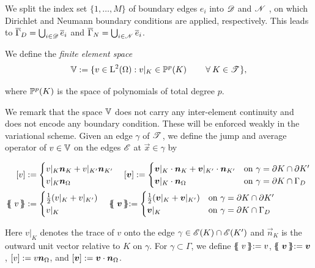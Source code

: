 \documentclass[a4paper,11pt]{article}
\begin{document}
{We split the index set $\{1,\dots,M\}$ of boundary edges $e_{i}$ into $\mathscr D$ and $\mathscr N$ , on which Dirichlet and Neumann boundary conditions are applied, respectively. This leads to $\overline{\Gamma}_{D} = \bigcup_{i\in \mathscr D}\overline{e}_{i}$ and $\overline{\Gamma}_{N} = \bigcup_{i\in \mathscr N}\overline{e}_{i}$. 

We define the \emph{finite element space}
\begin{gather}
  \label{eqn:def:finite-element-space}
  \mathbb V :=   \{ v\in \operatorname L^{2}(\Omega): v|_K \in \mathbb P^{p} (K) \quad \quad\:\forall\: K \in \mathscr T^{} \},
\end{gather}

where $\mathbb P^{p} (K)$ is the space of polynomials of total degree $p$.

We remark that the space $\mathbb V$ does not carry any inter-element continuity and does not encode any boundary condition. These will be enforced weakly in the variational scheme. 
Given an edge $\gamma$ of $\mathscr T^{}$, we define the jump and average operator of $v \in \mathbb V$ on the edges $\mathscr E$ at $\vec{x} \in \gamma$  by

\begin{align}
    \jump{v} &:=
    \begin{cases}
        v |_{K} \vec{n}_{K} + v |_{K'} \vec{n}_{K'} \\
        v |_{K} \vec{n}_{\Omega} 
    \end{cases} 
    \jump{\vec{v}} :=
    \begin{cases}
        \vec{v} |_{K} \cdot \vec{n}_{K} + \vec{v} |_{K'} \cdot \vec{n}_{K'} &  \text{on } \gamma = \partial K \cap  \partial K'\\
        \vec{v} |_{K} \cdot \vec{n}_{\Omega} &  \text{on } \gamma = \partial K \cap  \Gamma_{D} 
    \end{cases}
    \\
    \avg{v} &:=
    \begin{cases}
        \frac{1}{2} ( v |_{K} + v |_{K'}) \\
        v |_{K}  
    \end{cases} 
    \avg{\vec{v}} :=
    \begin{cases}
        \frac{1}{2}(\vec{v} |_{K} + \vec{v} |_{K'}) &  \text{on } \gamma = \partial K \cap  \partial K'\\
        \vec{v} |_{K} &  \text{on } \gamma = \partial K \cap  \Gamma_{D} 
    \end{cases}
\end{align}

Here $v|_{K}$ denotes the trace of $v$ onto the edge $\gamma \in \mathscr E(K) \cap \mathscr E(K')$ and $\vec{n}_{K}$ is the outward unit vector relative to $K$ on $\gamma$. For $\gamma \subset \Gamma$, we define $\avg{v} := v$, $\avg{\vec{v}} := \vec{v}$, $\left[ v\right]:= v\boldsymbol n_{\Omega}  $, and $\left[ \boldsymbol v\right]:= \boldsymbol v \cdot \boldsymbol n_{\Omega}$.

}
\end{document}
